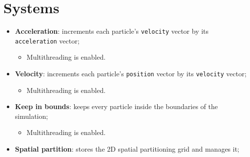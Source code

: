 \documentclass[twoside, 12pt, a4paper, openany]{book}
\providecommand{\tightlist}{%
  \setlength{\itemsep}{0pt}\setlength{\parskip}{0pt}}
\begin{document}
\section{Systems}\label{systems}

\begin{itemize}
\item
  \textbf{Acceleration}: increments each particle's
  \texttt{velocity}
  vector by its
  \texttt{acceleration}
  vector;

  \begin{itemize}
  \tightlist
  \item
    Multithreading is enabled.
  \end{itemize}
\item
  \textbf{Velocity}: increments each particle's
  \texttt{position}
  vector by its
  \texttt{velocity}
  vector;

  \begin{itemize}
  \tightlist
  \item
    Multithreading is enabled.
  \end{itemize}
\item
  \textbf{Keep in bounds}: keeps every particle inside the boundaries of
  the simulation;

  \begin{itemize}
  \tightlist
  \item
    Multithreading is enabled.
  \end{itemize}
\item
  \textbf{Spatial partition}: stores the 2D spatial partitioning grid
  and manages it;


\end{itemize}
\end{document}

